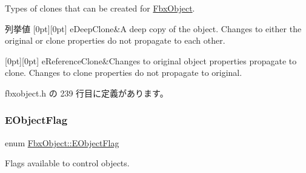 Types of clones that can be created for \hyperlink{class_fbx_object}{Fbx\+Object}. 

\begin{DoxyEnumFields}{列挙値}
[0pt][0pt]{}\mbox{\label{class_fbx_object_a9f5626b2d2135684d6ea1e6e4ad2acbbaacdf137ca059c572798287e98c4236d0}} 
e\+Deep\+Clone&A deep copy of the object. Changes to either the original or clone properties do not propagate to each other. \\
\hline

[0pt][0pt]{}\mbox{\label{class_fbx_object_a9f5626b2d2135684d6ea1e6e4ad2acbbae681cda4dccb3f5ccf260e5ccc47d88c}} 
e\+Reference\+Clone&Changes to original object properties propagate to clone. Changes to clone properties do not propagate to original. \\
\hline

\end{DoxyEnumFields}


 fbxobject.\+h の 239 行目に定義があります。

\mbox{\label{class_fbx_object_a117b8002963e9fe475a93556c217b244}} 
\subsubsection{\texorpdfstring{E\+Object\+Flag}{EObjectFlag}}
{\footnotesize\ttfamily enum \hyperlink{class_fbx_object_a117b8002963e9fe475a93556c217b244}{Fbx\+Object\+::\+E\+Object\+Flag}}



Flags available to control objects. 


